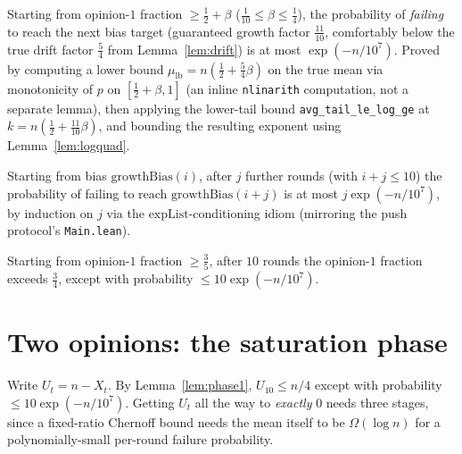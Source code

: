 \begin{lemma}\label{lem:growthround}
  \leanok
  Starting from opinion-$1$ fraction $\ge\tfrac12+\beta$
  ($\tfrac1{10}\le\beta\le\tfrac14$), the probability of \emph{failing} to
  reach the next bias target (guaranteed growth factor $\tfrac{11}{10}$,
  comfortably below the true drift factor $\tfrac54$ from
  Lemma~\ref{lem:drift}) is at most $\exp(-n/10^7)$. Proved by computing a
  lower bound $\mu_{\mathrm{lb}} = n(\tfrac12+\tfrac54\beta)$ on the true
  mean via monotonicity of $p$ on $[\tfrac12+\beta,1]$ (an inline
  \texttt{nlinarith} computation, not a separate lemma), then applying the
  lower-tail bound \texttt{avg\_tail\_le\_log\_ge} at
  $k=n(\tfrac12+\tfrac{11}{10}\beta)$, and bounding the resulting exponent
  using Lemma~\ref{lem:logquad}.
\end{lemma}

\begin{lemma}\label{lem:growthfail}
  \leanok
  Starting from bias $\mathrm{growthBias}(i)$, after $j$ further rounds
  (with $i+j\le10$) the probability of failing to reach
  $\mathrm{growthBias}(i+j)$ is at most $j\exp(-n/10^7)$, by induction on
  $j$ via the $\mathrm{expList}$-conditioning idiom (mirroring the push
  protocol's \texttt{Main.lean}).
\end{lemma}

\begin{lemma}[Phase 1]\label{lem:phase1}
  \leanok
  Starting from opinion-$1$ fraction $\ge\tfrac35$, after $10$ rounds the
  opinion-$1$ fraction exceeds $\tfrac34$, except with probability
  $\le10\exp(-n/10^7)$.
\end{lemma}

\section{Two opinions: the saturation phase}\label{sec:saturation}

Write $U_t = n-X_t$. By Lemma~\ref{lem:phase1}, $U_{10}\le n/4$ except with
probability $\le10\exp(-n/10^7)$. Getting $U_t$ all the way to
\emph{exactly} $0$ needs three stages, since a fixed-ratio Chernoff bound
needs the mean itself to be $\Omega(\log n)$ for a polynomially-small
per-round failure probability.

